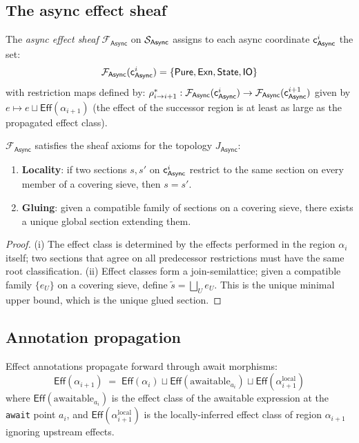 \documentclass[11pt]{article}
\newcommand{\Async}{\mathsf{Async}}          %
\newcommand{\AwaitMor}[2]{\rho_{#1 \to #2}} %
\newcommand{\asyncSite}{\Site_{\Async}}      %
\newcommand{\asyncCoord}[1]{\coord_{\Async}^{#1}} %
\newcommand{\asyncSheaf}{\mathcal{F}_{\Async}} %
\newcommand{\Epure}{\mathsf{Pure}}           %
\newcommand{\Eexn}{\mathsf{Exn}}             %
\newcommand{\Estate}{\mathsf{State}}         %
\newcommand{\Eio}{\mathsf{IO}}               %
\newcommand{\effectClass}[1]{\mathsf{Eff}(#1)} %
\newcommand{\asyncRegion}[1]{\alpha_{#1}}    %
\newcommand{\gluedSec}{\tilde{s}}            %
\begin{document}
\subsection{The async effect sheaf}

\begin{definition}\label{def:async-sheaf}
The \emph{async effect sheaf} $\asyncSheaf$ on $\asyncSite$ assigns to each
async coordinate $\asyncCoord{i}$ the set:
\[
  \asyncSheaf(\asyncCoord{i}) = \{\Epure, \Eexn, \Estate, \Eio\}
\]
with restriction maps defined by:
$\AwaitMor{i}{i+1}^* : \asyncSheaf(\asyncCoord{i}) \to \asyncSheaf(\asyncCoord{i+1})$
given by $e \mapsto e \sqcup \effectClass{\asyncRegion{i+1}}$
(the effect of the successor region is at least as large as the propagated
effect class).
\end{definition}

\begin{proposition}\label{prop:sheaf-axioms}
$\asyncSheaf$ satisfies the sheaf axioms for the topology $J_{\Async}$:
\begin{enumerate}[label=(\roman*)]
  \item \textbf{Locality}: if two sections $s, s'$ on $\asyncCoord{i}$
        restrict to the same section on every member of a covering sieve,
        then $s = s'$.
  \item \textbf{Gluing}: given a compatible family of sections on a
        covering sieve, there exists a unique global section extending them.
\end{enumerate}
\end{proposition}
\begin{proof}
(i) The effect class is determined by the effects performed in the
region $\asyncRegion{i}$ itself; two sections that agree on all predecessor
restrictions must have the same root classification.
(ii) Effect classes form a join-semilattice; given a compatible family
$\{e_U\}$ on a covering sieve, define $\gluedSec = \bigsqcup_U e_U$.
This is the unique minimal upper bound, which is the unique glued section.
\end{proof}

\subsection{Annotation propagation}

Effect annotations propagate forward through await morphisms:
\[
  \effectClass{\asyncRegion{i+1}} \;=\;
  \effectClass{\asyncRegion{i}} \sqcup \effectClass{\text{awaitable}_{a_i}}
    \sqcup \effectClass{\asyncRegion{i+1}^{\text{local}}}
\]
where $\effectClass{\text{awaitable}_{a_i}}$ is the effect class of the
awaitable expression at the \texttt{await} point $a_i$, and
$\effectClass{\asyncRegion{i+1}^{\text{local}}}$ is the locally-inferred
effect class of region $\asyncRegion{i+1}$ ignoring upstream effects.
\end{document}
